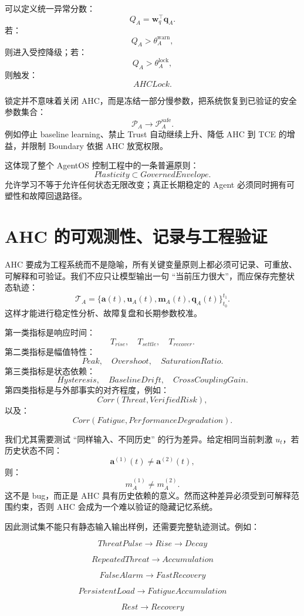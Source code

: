 可以定义统一异常分数：
\[
Q_A
=
\mathbf w_q^\top
\mathbf q_A.
\]
若：
\[
Q_A>\theta_A^{\mathrm{warn}},
\]
则进入受控降级；若：
\[
Q_A>\theta_A^{\mathrm{lock}},
\]
则触发：
\[
AHCLock.
\]

锁定并不意味着关闭 AHC，而是冻结一部分慢参数，把系统恢复到已验证的安全参数集合：
\[
\mathcal P_A
\rightarrow
\mathcal P_A^{\mathrm{safe}}.
\]
例如停止 baseline learning、禁止 Trust 自动继续上升、降低 AHC 到 TCE 的增益，并限制 Boundary 依据 AHC 放宽权限。

这体现了整个 AgentOS 控制工程中的一条普遍原则：
\[
\boxed{
Plasticity
\subset
GovernedEnvelope.
}
\]
允许学习不等于允许任何状态无限改变；真正长期稳定的 Agent 必须同时拥有可塑性和故障回退路径。


\section{AHC 的可观测性、记录与工程验证}

AHC 要成为工程系统而不是隐喻，所有关键变量原则上都必须可记录、可重放、可解释和可验证。我们不应只让模型输出一句 ``当前压力很大''，而应保存完整状态轨迹：
\[
\mathcal T_A
=
\{
\mathbf a(t),
\mathbf u_A(t),
\mathbf m_A(t),
\mathbf q_A(t)
\}_{t_0}^{t_1}.
\]
这样才能进行稳定性分析、故障复盘和长期参数校准。

第一类指标是响应时间：
\[
T_{rise},
\quad
T_{settle},
\quad
T_{recover}.
\]
第二类指标是幅值特性：
\[
Peak,
\quad
Overshoot,
\quad
SaturationRatio.
\]
第三类指标是状态依赖：
\[
Hysteresis,
\quad
BaselineDrift,
\quad
CrossCouplingGain.
\]
第四类指标是与外部事实的对齐程度，例如：
\[
Corr(
Threat,
VerifiedRisk
),
\]
以及：
\[
Corr(
Fatigue,
PerformanceDegradation
).
\]

我们尤其需要测试 ``同样输入、不同历史'' 的行为差异。给定相同当前刺激 $u_t$，若历史状态不同：
\[
\mathbf a^{(1)}(t)
\neq
\mathbf a^{(2)}(t),
\]
则：
\[
m_A^{(1)}
\neq
m_A^{(2)}.
\]
这不是 bug，而正是 AHC 具有历史依赖的意义。然而这种差异必须受到可解释范围约束，否则 AHC 会成为一个难以验证的隐藏记忆系统。

因此测试集不能只有静态输入输出样例，还需要完整轨迹测试。例如：

\[
ThreatPulse
\rightarrow
Rise
\rightarrow
Decay
\]

\[
RepeatedThreat
\rightarrow
Accumulation
\]

\[
FalseAlarm
\rightarrow
FastRecovery
\]

\[
PersistentLoad
\rightarrow
FatigueAccumulation
\]

\[
Rest
\rightarrow
Recovery
\]

